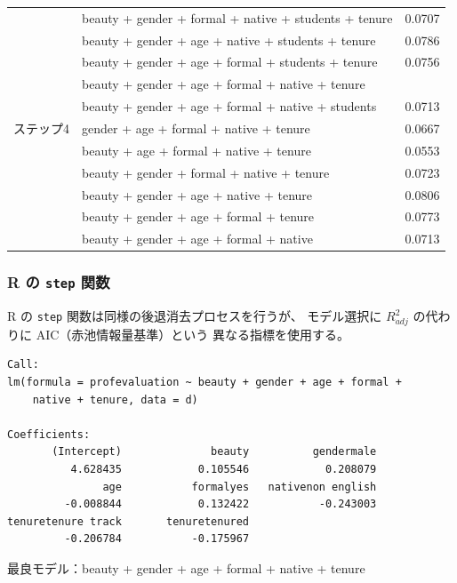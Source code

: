 \begin{frame}[shrink]
{\begin{tabular}{l | l | c}
		& beauty + gender + formal + native + students + tenure					& 0.0707 \\
		& beauty + gender + age + native + students + tenure					& 0.0786 \\
		& beauty + gender + age + formal + students + tenure					& 0.0756 \\
		& beauty + gender + age + formal + native + tenure						& \orange{0.0855} \\
		& beauty + gender + age + formal + native + students					& 0.0713 \\
\hline
ステップ4	& gender + age + formal + native + tenure 							& 0.0667 \\
		& beauty + age + formal + native + tenure								& 0.0553 \\
		& beauty + gender + formal + native + tenure							& 0.0723 \\
		& beauty + gender + age + native + tenure							& 0.0806 \\
		& beauty + gender + age + formal + tenure							& 0.0773 \\
		& beauty + gender + age + formal + native							& 0.0713 \\
\end{tabular}
}

\end{frame}


\begin{frame}[fragile]
\frametitle{R の \texttt{step} 関数}

R の \texttt{step} 関数は同様の後退消去プロセスを行うが、
モデル選択に $R^2_{adj}$ の代わりに AIC（赤池情報量基準）という
異なる指標を使用する。

{\tiny
\begin{verbatim}
Call:
lm(formula = profevaluation ~ beauty + gender + age + formal +
    native + tenure, data = d)

Coefficients:
       (Intercept)              beauty          gendermale
          4.628435            0.105546            0.208079
               age           formalyes   nativenon english
         -0.008844            0.132422           -0.243003
tenuretenure track       tenuretenured
         -0.206784           -0.175967
\end{verbatim}
}

最良モデル：beauty + gender + age + formal + native + tenure

\end{frame}

